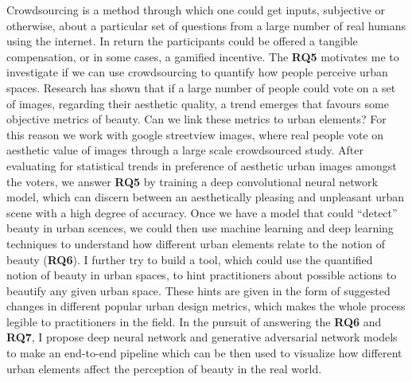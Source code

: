 \noindent{}

\noindent{}

\noindent{}
\vspace{0.5cm}

Crowdsourcing is a method through which one could get inputs, subjective or otherwise, about a particular set of questions from a large number of real humans using the internet. In return the participants could be offered a tangible compensation, or in some cases, a gamified incentive. 
The \textbf{RQ5} motivates me to investigate if we can use crowdsourcing to quantify how people perceive urban spaces. Research has shown that if a large number of people could vote on a set of images, regarding their aesthetic quality, a trend emerges that favours some objective metrics of beauty\cite{datta2008algorithmic,quercia2014aesthetic}. Can we link these metrics to urban elements? For this reason we work with google streetview images, where real people vote on aesthetic value of images through a large scale crowdsourced study. After evaluating for statistical trends in preference of aesthetic urban images amongst the voters, we answer \textbf{RQ5} by training a deep convolutional neural network model, which can discern between an aesthetically pleasing and unpleasant urban scene with a high degree of accuracy. Once we have a model that could ``detect'' beauty in urban scences, we could then use machine learning and deep learning techniques to understand how different urban elements relate to the notion of beauty (\textbf{RQ6}). I further try to build a tool, which could use the quantified notion of beauty in urban spaces, to hint practitioners about possible actions to beautify any given urban space. These hints are given in the form of suggested changes in different popular urban design metrics, which makes the whole process legible to practitioners in the field. In the pursuit of answering the \textbf{RQ6} and  \textbf{RQ7}, I propose deep neural network and generative adversarial network models to make an end-to-end pipeline which can be then used to visualize how different urban elements affect the perception of beauty in the real world.

